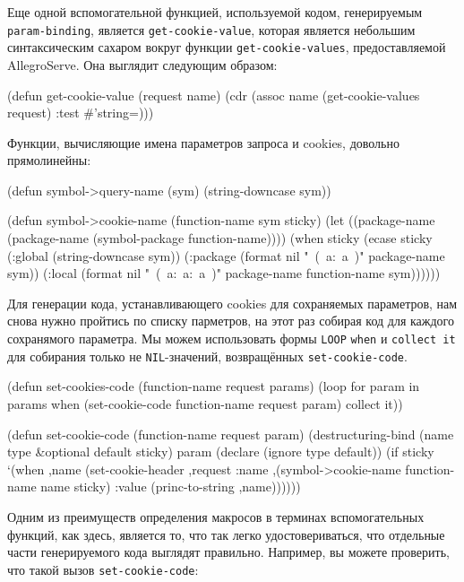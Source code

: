 Еще одной вспомогательной функцией, используемой кодом, генерируемым \lstinline{param-binding},
является \lstinline{get-cookie-value}, которая является небольшим синтаксическим сахаром вокруг
функции \lstinline{get-cookie-values}, предоставляемой AllegroServe. Она выглядит следующим
образом:

\begin{myverb}
  (defun get-cookie-value (request name)
    (cdr (assoc name (get-cookie-values request) :test #'string=)))
\end{myverb}

Функции, вычисляющие имена параметров запроса и cookies, довольно прямолинейны:

\begin{myverb}
  (defun symbol->query-name (sym)
    (string-downcase sym))

  (defun symbol->cookie-name (function-name sym sticky)
    (let ((package-name (package-name (symbol-package function-name))))
      (when sticky
        (ecase sticky
          (:global
           (string-downcase sym))
          (:package
           (format nil "~(~a:~a~)" package-name sym))
          (:local 
           (format nil "~(~a:~a:~a~)" package-name function-name sym))))))
\end{myverb}

Для генерации кода, устанавливающего cookies для сохраняемых параметров, нам снова нужно
пройтись по списку парметров, на этот раз собирая код для каждого сохранямого
параметра. Мы можем использовать формы \lstinline{LOOP} \lstinline{when} и \lstinline{collect it} для
собирания только не \lstinline{NIL}-значений, возвращённых \lstinline{set-cookie-code}.

\begin{myverb}
  (defun set-cookies-code (function-name request params)
    (loop for param in params
         when (set-cookie-code function-name request param) collect it))

  (defun set-cookie-code (function-name request param)
    (destructuring-bind (name type &optional default sticky) param
      (declare (ignore type default))
      (if sticky
        `(when ,name 
           (set-cookie-header 
            ,request
            :name ,(symbol->cookie-name function-name name sticky)
            :value (princ-to-string ,name))))))
\end{myverb}

Одним из преимуществ определения макросов в терминах вспомогательных функций, как здесь,
является то, что так легко удостовериваться, что отдельные части генерируемого кода
выглядят правильно. Например, вы можете проверить, что такой вызов \lstinline{set-cookie-code}:

